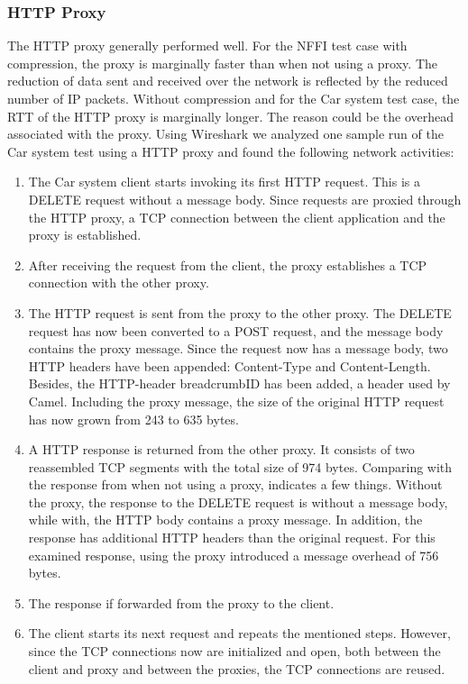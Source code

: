 \subsubsection{HTTP Proxy}

The HTTP proxy generally performed well. For the NFFI test case with
compression, the proxy is marginally faster than when not using a proxy. The
reduction of data sent and received over the network is reflected by the reduced
number of IP packets. Without compression and for the Car system test case, the
RTT of the HTTP proxy is marginally longer. The reason could be the overhead
associated with the proxy. Using Wireshark we analyzed one sample run of the Car
system test using a HTTP proxy and found the following network activities:

\begin{enumerate}

    \item The Car system client starts invoking its first HTTP request. This is
    a DELETE request without a message body. Since requests are proxied through
    the HTTP proxy, a TCP connection between the client application and the
    proxy is established.

    \item After receiving the request from the client, the proxy establishes a
    TCP connection with the other proxy.

    \item The HTTP request is sent from the proxy to the other proxy. The DELETE
    request has now been converted to a POST request, and the message body
    contains the proxy message. Since the request now has a message body, two
    HTTP headers have been appended: Content-Type and Content-Length. Besides,
    the HTTP-header breadcrumbID has been added, a header used by Camel.
    Including the proxy message, the size of the original HTTP request has now
    grown from 243 to 635 bytes.

	\item A HTTP response is returned from the other proxy. It consists of two
	reassembled TCP segments with the total size of 974  bytes. Comparing with the
	response from when not using a proxy, indicates a few things. Without the
	proxy, the response to the DELETE request is without a message body, while
	with, the HTTP body contains a proxy message. In addition, the response has
	additional HTTP headers than the original request. For this examined response,
	using the proxy introduced a message overhead of 756 bytes.

    \item The response if forwarded from the proxy to the client.

    \item The client starts its next request and repeats the mentioned steps.
    However, since the TCP connections now are initialized and open, both
    between the client and proxy and between the proxies, the TCP connections
    are reused.


  \end{enumerate}

